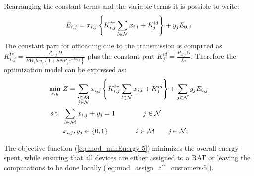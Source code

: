 \documentclass[twoside,openright]{report}
\begin{document}
Rearranging the constant terms and the variable terms it is possible to write:
\begin{equation}
E_{i,j} = x_{i,j} \left\{ K^\textit{tr}_{i,j} \sum_{l \in \cal{N}} x_{i,l} + K^{id}_j \right\} + y_j E_{0,j}
\label{eq:energyODmodel-5}
\end{equation}
The constant part for offloading due to the transmission is computed as $K^\textit{tr}_{i,j} = \frac{P_\textit{tr j}\,D}{\textit{BW}_ilog_2\left\{1+\textit{SNR}_j e^{-k d_\textit{i,j}} \right\}}$ plus the constant part $ K^{id}_j = \frac{P_{id\,j}\,O }{f_{cc}}$.
Therefore the optimization model can be expressed as:
\begin{subequations}
\label{mod:assignmentModel-5}
\begin{flalign}
\min_{x,y}\ & Z = \sum_{\substack{ i \in \cal{M} \\ j \in \cal{N}}} x_{i,j} \left\{ K^{tr}_{i,j} \sum_{l \in \cal{N}} x_{i,l}  + K^{id}_j \right\} + \sum_{j \in \cal{N}} y_j E_{0,j} \label{eq:mod_minEnergy-5} \\
\mbox{s.t. }& \sum_{i \in \cal{M}} x_{i,j} + y_j = 1 \qquad\qquad  j \in \cal{N} \label{eq:mod_assign_all_customers-5}\\
 & x_{i,j}, y_j  \in \{0,1\} \qquad\qquad i \in \cal{M} \qquad \textit{j} \in \cal{N};
\end{flalign}
\end{subequations}

The objective function (\autoref{eq:mod_minEnergy-5}) minimizes the overall energy spent, while ensuring that all devices are either assigned to a \gls{RAT} or leaving the computations to be done locally (\autoref{eq:mod_assign_all_customers-5}). 
\end{document}
